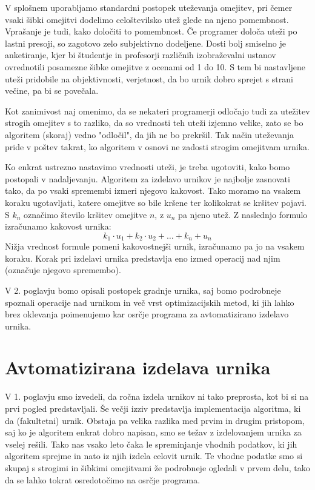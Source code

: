 \documentclass[a4paper, 10pt]{article}
\begin{document}
V splošnem uporabljamo standardni postopek uteževanja omejitev, pri čemer vsaki šibki
omejitvi dodelimo celoštevilsko utež glede na njeno pomembnost. Vprašanje je tudi, kako
določiti to pomembnost. Če programer določa uteži po lastni presoji, so zagotovo zelo
subjektivno dodeljene. Dosti bolj smiselno je anketiranje, kjer bi študentje in profesorji
različnih izobraževalni ustanov ovrednotili posamezne šibke omejitve z ocenami od 1 do 10.
S tem bi nastavljene uteži pridobile na objektivnosti, verjetnost, da bo urnik dobro
sprejet s strani večine, pa bi se povečala.

Kot zanimivost naj omenimo, da se nekateri programerji odločajo tudi za utežitev strogih
omejitev s to razliko, da so vrednosti teh uteži izjemno velike, zato se bo algoritem
(skoraj) vedno "odločil", da jih ne bo prekršil. Tak način uteževanja pride v poštev
takrat, ko algoritem v osnovi ne zadosti strogim omejitvam urnika.

Ko enkrat ustrezno nastavimo vrednosti uteži, je treba ugotoviti, kako bomo postopali
v nadaljevanju. Algoritem za izdelavo urnikov je najbolje zasnovati tako, da po vsaki
spremembi izmeri njegovo kakovost. Tako moramo na vsakem koraku ugotavljati, katere
omejitve so bile kršene ter kolikokrat se kršitev pojavi. S $k_n$ označimo število
kršitev omejitve $n$, z $u_n$ pa njeno utež. Z naslednjo formulo izračunamo
kakovost urnika:
$$
k_1 \cdot u_1 + k_2 \cdot u_2 + \dots + k_n + u_n 
$$
Nižja vrednost formule pomeni kakovostnejši urnik, izračunamo pa jo na vsakem koraku.
Korak pri izdelavi urnika predstavlja eno izmed operacij nad njim (označuje njegovo
spremembo).

V 2. poglavju bomo opisali postopek gradnje urnika, saj bomo podrobneje spoznali
operacije nad urnikom in več vrst optimizacijskih metod, ki jih lahko brez oklevanja
poimenujemo kar osrčje programa za avtomatizirano izdelavo urnika.

\section{Avtomatizirana izdelava urnika}

V 1. poglavju smo izvedeli, da ročna izdela urnikov ni tako preprosta, kot bi si
na prvi pogled predstavljali. Še večji izziv predstavlja implementacija algoritma, ki da
(fakultetni) urnik. Obstaja pa velika razlika med prvim in drugim pristopom, saj ko je
algoritem enkrat dobro napisan, smo se težav z izdelovanjem urnika za vselej rešili.
Tako nas vsako leto čaka le spreminjanje vhodnih podatkov, ki jih algoritem sprejme in
nato iz njih izdela celovit urnik. Te vhodne podatke smo si skupaj s strogimi in šibkimi
omejitvami že podrobneje ogledali v prvem delu, tako da se lahko tokrat osredotočimo na
osrčje programa.
\end{document}

